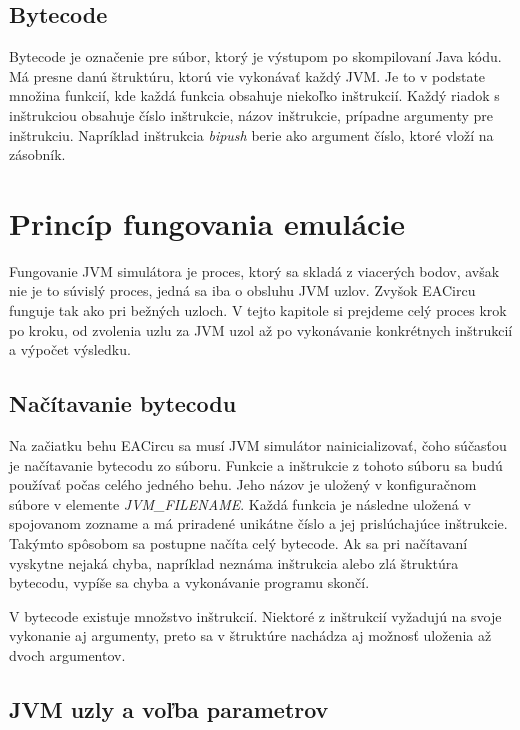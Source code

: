 \subsection{Bytecode}
\label{subsec:bytecode}

Bytecode je označenie pre súbor, ktorý je výstupom po skompilovaní Java kódu. Má presne danú štruktúru, ktorú vie vykonávať každý JVM. Je to v podstate množina funkcií, kde každá funkcia obsahuje niekoľko inštrukcií. Každý riadok s inštrukciou obsahuje číslo inštrukcie, názov inštrukcie, prípadne argumenty pre inštrukciu. Napríklad inštrukcia \textit{bipush} berie ako argument číslo, ktoré vloží na zásobník. 

\section{Princíp fungovania emulácie}
\label{sec:jvm-principle}

Fungovanie JVM simulátora je proces, ktorý sa skladá z viacerých bodov, avšak nie je to súvislý proces, jedná sa iba o obsluhu JVM uzlov. Zvyšok EACircu funguje tak ako pri bežných uzloch. V tejto kapitole si prejdeme celý proces krok po kroku, od zvolenia uzlu za JVM uzol až po vykonávanie konkrétnych inštrukcií a výpočet výsledku. 

\subsection{Načítavanie bytecodu}
\label{parsing-bytecode}

Na začiatku behu EACircu sa musí JVM simulátor nainicializovať, čoho súčasťou je načítavanie bytecodu zo súboru. Funkcie a inštrukcie z tohoto súboru sa budú používať počas celého jedného behu. Jeho názov je uložený v konfiguračnom súbore v elemente \textit{JVM\_FILENAME}. Každá funkcia je následne uložená v spojovanom zozname a má priradené unikátne číslo a jej prislúchajúce inštrukcie. Takýmto spôsobom sa postupne načíta celý bytecode. Ak sa pri načítavaní vyskytne nejaká chyba, napríklad neznáma inštrukcia alebo zlá štruktúra bytecodu, vypíše sa chyba a vykonávanie programu skončí.

V bytecode existuje množstvo inštrukcií. Niektoré z inštrukcií vyžadujú na svoje vykonanie aj argumenty, preto sa v štruktúre nachádza aj možnosť uloženia až dvoch argumentov.

\subsection{JVM uzly a voľba parametrov}
\label{subsec:jvm-nodes}

